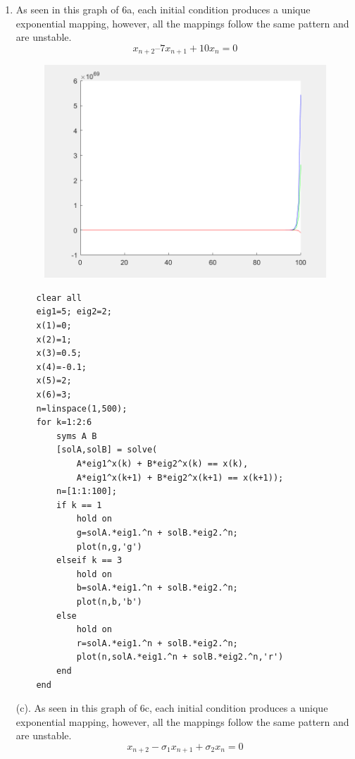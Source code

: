 \begin{homeworkProblem}[6]
    \begin{enumerate}
    \item \begin{multicols}{2}
    As seen in this graph of 6a, each initial condition produces a unique
    exponential mapping, however, all the mappings follow the same pattern and are
    unstable.
    $$
    x_{n+2} – 7x_{n+1} + 10x_n = 0
    $$

    \begin{figure}[H]
        \centering
        \includegraphics[scale=0.3]{fig/fig6(a).png}
    \end{figure}

    \end{multicols}

    \begin{listing}[htbp]
        \begin{tcolorbox}
        \begin{verbatim}
    clear all
    eig1=5; eig2=2;
    x(1)=0;
    x(2)=1;
    x(3)=0.5;
    x(4)=-0.1;
    x(5)=2;
    x(6)=3;
    n=linspace(1,500);
    for k=1:2:6
        syms A B
        [solA,solB] = solve(
            A*eig1^x(k) + B*eig2^x(k) == x(k),
            A*eig1^x(k+1) + B*eig2^x(k+1) == x(k+1));
        n=[1:1:100];
        if k == 1
            hold on
            g=solA.*eig1.^n + solB.*eig2.^n;
            plot(n,g,'g')
        elseif k == 3
            hold on
            b=solA.*eig1.^n + solB.*eig2.^n;
            plot(n,b,'b')
        else
            hold on
            r=solA.*eig1.^n + solB.*eig2.^n;
            plot(n,solA.*eig1.^n + solB.*eig2.^n,'r')
        end
    end
        \end{verbatim}
        \end{tcolorbox}
    \end{listing}
    \pagebreak
    \begin{multicols}{2}
    (c). As seen in this graph of 6c, each initial condition produces a unique
    exponential mapping, however, all the mappings follow the same pattern and are
    unstable.
    $$
    x_{n+2} - \sigma_1 x_{n+1} + \sigma_2 x_n = 0
    $$


\end{multicols}
\end{enumerate}
\end{homeworkProblem}
